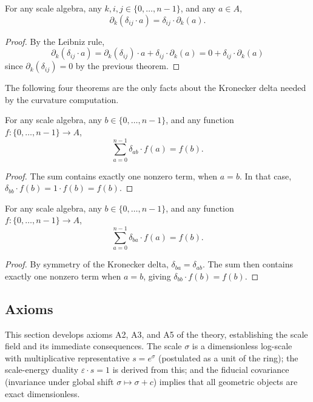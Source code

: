 \begin{theorem}
For any scale algebra, any $k, i, j \in \{0,\ldots,n-1\}$, and any $a \in A$,
$$\partial_k(\delta_{ij} \cdot a) = \delta_{ij} \cdot \partial_k(a).$$
\end{theorem}
\begin{proof}
By the Leibniz rule,
$$\partial_k(\delta_{ij} \cdot a) = \partial_k(\delta_{ij}) \cdot a + \delta_{ij} \cdot \partial_k(a) = 0 + \delta_{ij} \cdot \partial_k(a)$$
since $\partial_k(\delta_{ij}) = 0$ by the previous theorem.
\end{proof}

The following four theorems are the only facts about the Kronecker delta needed by the curvature computation.

\begin{theorem}
For any scale algebra, any $b \in \{0,\ldots,n-1\}$, and any function $f : \{0,\ldots,n-1\} \to A$,
$$\sum_{a=0}^{n-1} \delta_{ab} \cdot f(a) = f(b).$$
\end{theorem}
\begin{proof}
The sum contains exactly one nonzero term, when $a = b$. In that case, $\delta_{bb} \cdot f(b) = 1 \cdot f(b) = f(b)$.
\end{proof}

\begin{theorem}
For any scale algebra, any $b \in \{0,\ldots,n-1\}$, and any function $f : \{0,\ldots,n-1\} \to A$,
$$\sum_{a=0}^{n-1} \delta_{ba} \cdot f(a) = f(b).$$
\end{theorem}
\begin{proof}
By symmetry of the Kronecker delta, $\delta_{ba} = \delta_{ab}$. The sum then contains exactly one nonzero term when $a = b$, giving $\delta_{bb} \cdot f(b) = f(b)$.
\end{proof}

\subsection{Axioms}

This section develops axioms A2, A3, and A5 of the theory, establishing the scale field and its immediate consequences. The scale $\sigma$ is a dimensionless log-scale with multiplicative representative $s = e^\sigma$ (postulated as a unit of the ring); the scale-energy duality $\varepsilon \cdot s = 1$ is derived from this; and the fiducial covariance (invariance under global shift $\sigma \mapsto \sigma + c$) implies that all geometric objects are exact dimensionless.

